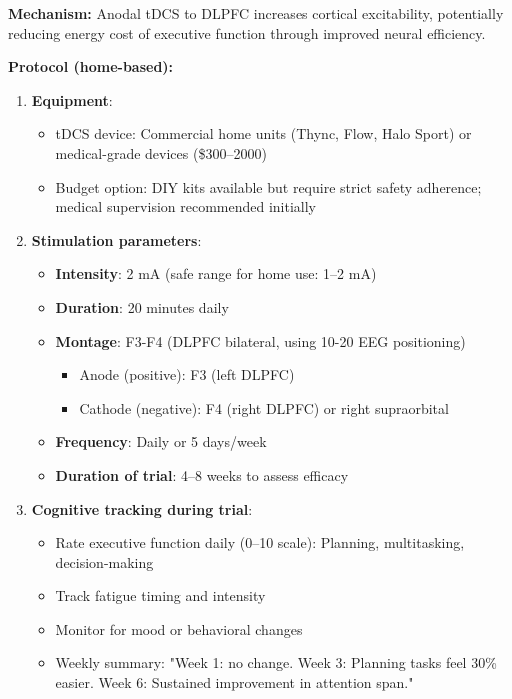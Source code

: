 \begin{recommendation}
\label{rec:tdcs-mild-moderate}

\textbf{Mechanism:} Anodal tDCS to DLPFC increases cortical excitability, potentially reducing energy cost of executive function through improved neural efficiency.

\textbf{Protocol (home-based):}

\begin{enumerate}
    \item \textbf{Equipment}:
    \begin{itemize}
        \item tDCS device: Commercial home units (Thync, Flow, Halo Sport) or medical-grade devices (\$300--2000)
        \item Budget option: DIY kits available but require strict safety adherence; medical supervision recommended initially
    \end{itemize}

    \item \textbf{Stimulation parameters}:
    \begin{itemize}
        \item \textbf{Intensity}: 2 mA (safe range for home use: 1--2 mA)
        \item \textbf{Duration}: 20 minutes daily
        \item \textbf{Montage}: F3-F4 (DLPFC bilateral, using 10-20 EEG positioning)
        \begin{itemize}
            \item Anode (positive): F3 (left DLPFC)
            \item Cathode (negative): F4 (right DLPFC) or right supraorbital
        \end{itemize}
        \item \textbf{Frequency}: Daily or 5 days/week
        \item \textbf{Duration of trial}: 4--8 weeks to assess efficacy
    \end{itemize}

    \item \textbf{Cognitive tracking during trial}:
    \begin{itemize}
        \item Rate executive function daily (0--10 scale): Planning, multitasking, decision-making
        \item Track fatigue timing and intensity
        \item Monitor for mood or behavioral changes
        \item Weekly summary: "Week 1: no change. Week 3: Planning tasks feel 30\% easier. Week 6: Sustained improvement in attention span."
    \end{itemize}


\end{enumerate}
\end{recommendation}
